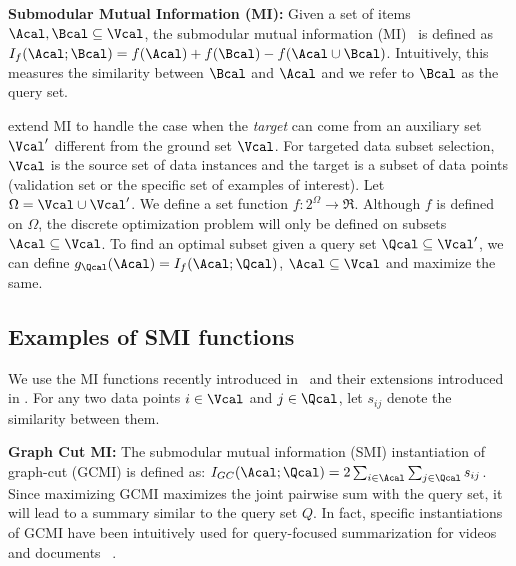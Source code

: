 \documentclass{article}
\begin{document}
\textbf{Submodular Mutual Information (MI):} Given a set of items $\Acal, \Bcal \subseteq \Vcal$, the submodular mutual information (MI)~\citep{levin2020online,iyer2020submodular} is defined as $I_f(\Acal; \Bcal) = f(\Acal) + f(\Bcal) - f(\Acal \cup \Bcal)$. Intuitively, this measures the similarity between $\Bcal$ and $\Acal$ and we refer to $\Bcal$ as the query set.

\cite{kaushal2020unified} extend MI to handle the case when the \emph{target} can come from an auxiliary set $\Vcal^{\prime}$ different from the ground set $\Vcal$. For targeted data subset selection, $\Vcal$ is the source set of data instances and the target is a subset of data points (validation set or the specific set of examples of interest).
Let $\Omega  = \Vcal \cup \Vcal^{\prime}$. We define a set function $f: 2^{\Omega} \rightarrow \Re$. Although $f$ is defined on $\Omega$, the discrete optimization problem will only be defined on subsets $\Acal \subseteq \Vcal$. To find an optimal subset given a query set $\Qcal \subseteq \Vcal^{\prime}$, we can define $g_{\Qcal}(\Acal) = I_f(\Acal; \Qcal)$, $\Acal \subseteq \Vcal$ and maximize the same.
\subsection{Examples of SMI functions}
We use the MI functions recently introduced in~\cite{iyer2020submodular, levin2020online} and their extensions introduced in \cite{kaushal2020unified}. 
For any two data points $i \in \Vcal$ and $j \in \Qcal$, let $s_{ij}$ denote the similarity between them.

\noindent\textbf{Graph Cut MI:} The submodular mutual information (SMI) instantiation of graph-cut (GCMI) is defined as: $I_{GC}(\Acal;\Qcal)=2\sum_{i \in \Acal} \sum_{j \in \Qcal} s_{ij}$.
Since maximizing GCMI maximizes the joint pairwise sum with the query set, it will lead to a summary similar to the query set $Q$. In fact, specific instantiations of GCMI have been intuitively used for query-focused summarization for videos ~\cite{vasudevan2017query} and documents ~\cite{lin2012submodularity, li2012multi}. 

\end{document}
